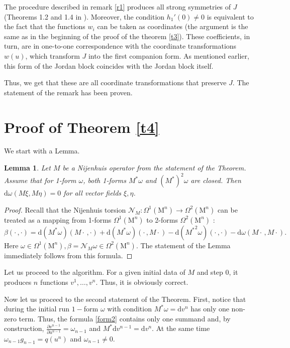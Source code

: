 \documentclass[12pt]{article}
\newtheorem{Lemma}{Lemma}[section]
\theoremstyle{remark}
\newcommand{\ddd}{\mathrm{d}}
\newcommand{\pd}[2]{\frac{\partial#1}{\partial#2}}
\begin{document}
The procedure described in remark \ref{r1} produces all strong symmetries of $J$ (Theorems 1.2 and 1.4 in \cite{nij4}). Moreover, the condition $h_1'(0) \neq 0$ is equivalent to the fact that the functions $w_i$ can be taken as coordinates (the argument is the same as in the beginning of the proof of the theorem \ref{t3}). These coefficients, in turn, are in one-to-one correspondence with the coordinate transformations $w(u)$, which transform $J$ into the first companion form. As mentioned earlier, this form of the Jordan block coincides with the Jordan block itself.

Thus, we get that these are all coordinate transformations that preserve $J$. The statement of the remark has been proven.



\section{Proof of Theorem \ref{t4}}\label{proof4}

We start with a Lemma.

\begin{Lemma}\label{krp1}
Let $M$ be a Nijenhuis operator from the statement of the Theorem. Assume that for 1-form $\omega$, both 1-forms $M^*\omega$ and $(M^*)^2 \omega$ are closed. Then $\ddd \omega (M\xi, M\eta) = 0$ for all vector fields $\xi, \eta$.
\end{Lemma}
\begin{proof}
Recall that the Nijenhuis torsion $\mathcal N_M : \Omega^1(\mathrm M^n) \to \Omega^2(\mathrm M^n)$ can be treated as a mapping from 1-forms $\Omega^1(\mathrm M^n)$ to 2-forms $\Omega^2(\mathrm M^n)$ \cite{nij1}:
$$
\beta( \cdot\, , \cdot ) = \ddd(M^*\omega) (M\cdot\, , \cdot) + \ddd(M^*\omega) (\cdot\, , M\cdot) - \ddd({M^*}^2\omega) (\cdot\, ,\cdot) - \ddd\omega (M\cdot\, ,M\cdot).  
$$
Here $\omega \in \Omega^1(\mathrm M^n), \beta = \mathcal N_M \omega \in \Omega^2(\mathrm M^n)$. The statement of the Lemma immediately follows from this formula.
\end{proof}

Let us proceed to the algorithm. For a given initial data of $M$ and step 0, it produces $n$ functions $v^1, \dots, v^n$. Thus, it is obviously correct.

Now let us proceed to the second statement of the Theorem. First, notice that during the initial run $1-$form $\omega$ with condition $M^* \omega = \ddd v^n$ has only one non-zero term. Thus, the formula \eqref{form2} contains only one summand and, by construction, $\pd{v^{n - 1}}{u^{n - 1}} = \omega_{n - 1}$ and $M^* \ddd v^{n - 1} = \ddd v^n$. At the same time $\omega_{n - 1} g_{n - 1} = q(u^n)$ and $\omega_{n - 1} \neq 0$.
\end{document}
